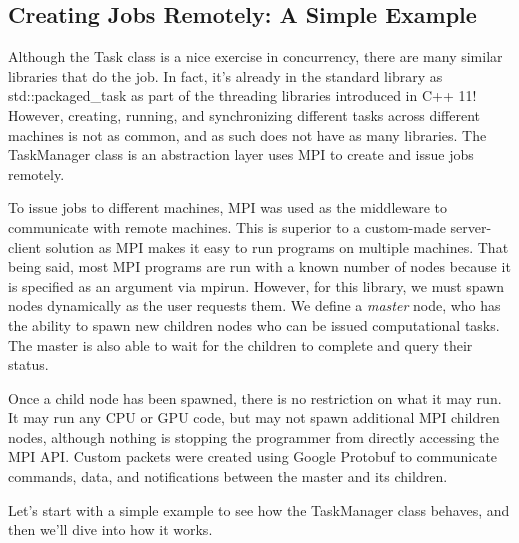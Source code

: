\documentclass[11pt]{article}
\begin{document}
        \subsection{Creating Jobs Remotely: A Simple Example}
            Although the Task class is a nice exercise in concurrency, there are many similar libraries that
            do the job. In fact, it's already in the standard library as std::packaged\_task as part
            of the threading libraries introduced in C++ 11! However, creating, running, and synchronizing
            different tasks across different machines is not as common, and as such does not have as many libraries.
            The TaskManager class is an abstraction layer uses MPI to create and issue jobs remotely. 
            
            To issue jobs to different machines, MPI was used as the middleware to communicate with remote
            machines. This is superior to a custom-made server-client solution as MPI makes it easy to run programs
            on multiple machines. That being said, most MPI programs are run with a known number of nodes because
            it is specified as an argument via mpirun. However, for this library, we must spawn nodes dynamically
            as the user requests them. We define a \textit{master} node, who has the ability to spawn new children
            nodes who can be issued computational tasks. The master is also able to wait for the children to
            complete and query their status. 
            
            Once a child node has been spawned, there is no restriction on what it may run. It may run any CPU or
            GPU code, but may not spawn additional MPI children nodes, although nothing is stopping the programmer
            from directly accessing the MPI API. Custom packets were created using Google Protobuf to communicate
            commands, data, and notifications between the master and its children.
            
            Let's start with a simple example to see how the TaskManager class behaves, and then we'll dive
            into how it works.
           
            \pagebreak
            
\end{document}
